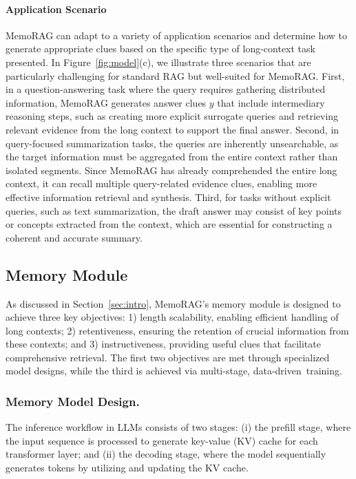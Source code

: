 \documentclass[sigconf]{acmart}
\begin{document}
\paragraph{Application Scenario} MemoRAG can adapt to a variety of application scenarios and determine how to generate appropriate clues based on the specific type of long-context task presented. In Figure~\ref{fig:model}(c), we illustrate three scenarios that are particularly challenging for standard RAG but well-suited for MemoRAG. 
First, in a question-answering task where the query requires gathering distributed information, MemoRAG generates answer clues $y$ that include intermediary reasoning steps, such as creating more explicit surrogate queries and retrieving relevant evidence from the long context to support the final answer.
Second, in query-focused summarization tasks, the queries are inherently unsearchable, as the target information must be aggregated from the entire context rather than isolated segments. Since MemoRAG has already comprehended the entire long context, it can recall multiple query-related evidence clues, enabling more effective information retrieval and synthesis.
Third, for tasks without explicit queries, such as text summarization, the draft answer may consist of key points or concepts extracted from the context, which are essential for constructing a coherent and accurate summary. 




\subsection{Memory Module}
\label{sec:mem}
As discussed in Section~\ref{sec:intro}, MemoRAG’s memory module is designed to achieve three key objectives: 1) length scalability, enabling efficient handling of long contexts; 2) retentiveness, ensuring the retention of crucial information from these contexts; and 3) instructiveness, providing useful clues that facilitate comprehensive retrieval. The first two objectives are met through specialized model designs, while the third is achieved via multi-stage, data-driven~training.

\subsubsection{Memory Model Design.}
The inference workflow in LLMs consists of two stages: (i) the prefill stage, where the input sequence is processed to generate key-value (KV) cache for each transformer layer; and (ii) the decoding stage, where the model sequentially generates tokens by utilizing and updating the KV cache.
\end{document}
